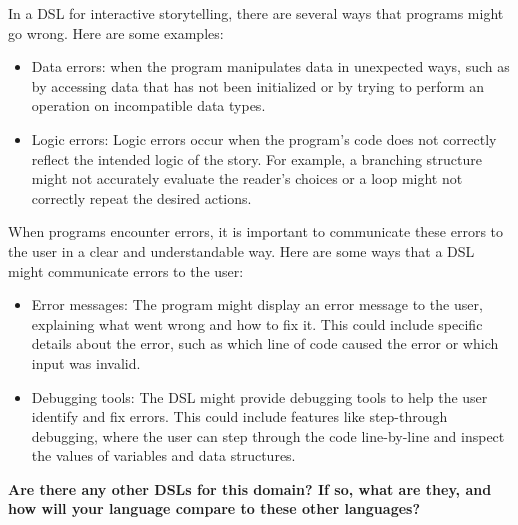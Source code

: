 In a DSL for interactive storytelling, there are several ways that programs might go wrong. Here are some examples:
\begin{itemize}
                \item Data errors: when the program manipulates data in unexpected ways, such as by accessing data that has not been initialized or by trying to perform an operation on incompatible data types.
                \item Logic errors: Logic errors occur when the program's code does not correctly reflect the intended logic of the story. For example, a branching structure might not accurately evaluate the reader's choices or a loop might not correctly repeat the desired actions.
 \end{itemize}
When programs encounter errors, it is important to communicate these errors to the user in a clear and understandable way. Here are some ways that a DSL might communicate errors to the user:
\begin{itemize}
                \item Error messages: The program might display an error message to the user, explaining what went wrong and how to fix it. This could include specific details about the error, such as which line of code caused the error or which input was invalid.
                \item Debugging tools: The DSL might provide debugging tools to help the user identify and fix errors. This could include features like step-through debugging, where the user can step through the code line-by-line and inspect the values of variables and data structures.
 \end{itemize}
 
\textbf {Are there any other DSLs for this domain? If so, what are they, and how will your language compare to these other languages?} 


